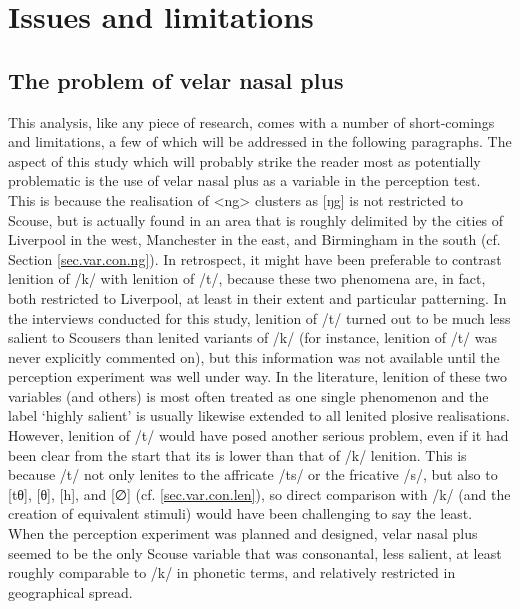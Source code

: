 	\section{Issues and limitations}
		\label{sec.perc_res.disc.issues}

		\subsection{The problem of velar nasal plus}

This analysis, like any piece of research, comes with a number of short-comings and limitations, a few of which will be addressed in the following paragraphs.
The aspect of this study which will probably strike the reader most as potentially problematic is the use of velar nasal plus as a variable in the perception test.
This is because the realisation of <ng> clusters as [ŋg] is not restricted to Scouse, but is actually found in an area that is roughly delimited by the cities of Liverpool in the west, Manchester in the east, and Birmingham in the south (cf. Section \ref{sec.var.con.ng}).
In retrospect, it might have been preferable to contrast lenition of /k/ with lenition of /t/, because these two phenomena are, in fact, both restricted to Liverpool, at least in their extent and particular patterning.
In the interviews conducted for this study, lenition of /t/ turned out to be much less salient to Scousers than lenited variants of /k/ (for instance, lenition of /t/ was never explicitly commented on), but this information was not available until the perception experiment was well under way.
In the literature, lenition of these two variables (and others) is most often treated as one single phenomenon and the label `highly salient' is usually likewise extended to all lenited plosive realisations.
However, lenition of /t/ would have posed another serious problem, even if it had been clear from the start that its  is lower than that of /k/ lenition.
This is because /t/ not only lenites to the affricate /ts/ or the fricative /s/, but also to [tθ], [θ], [h], and [∅] (cf. \ref{sec.var.con.len}), so direct comparison with /k/ (and the creation of equivalent stimuli) would have been challenging to say the least.
When the perception experiment was planned and designed, velar nasal plus seemed to be the only Scouse variable that was consonantal, less salient, at least roughly comparable to /k/ in phonetic terms, and relatively restricted in geographical spread.

